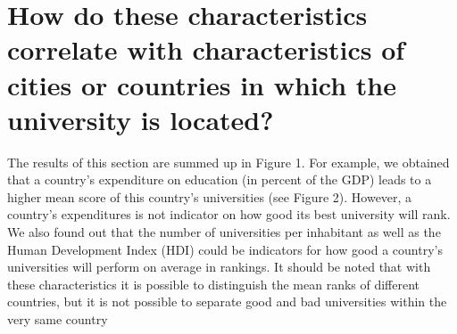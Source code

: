 \documentclass{article}
\begin{document}
\section*{\large{How do these characteristics correlate with characteristics of cities or countries in which the university is located?}}

The results of this section are summed up in Figure 1. For example, we obtained that a country's expenditure on education (in percent of the GDP) leads to a higher mean score of this country's universities (see Figure 2). However, a country's expenditures is not indicator on how good its best university will rank. We also found out that the number of universities per inhabitant as well as the Human Development Index (HDI) could be indicators for how good a country's universities will perform on average in rankings. It should be noted that with these characteristics it is possible to distinguish the mean ranks of different countries, but it is not possible to separate good and bad universities within the very same country
\end{document}
